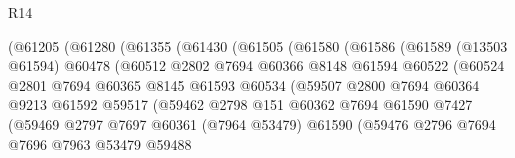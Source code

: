\begin{lexlean}{R14}
\begin{coremodule}
                        (@61205
                          (@61280
                            (@61355
                              (@61430
                                (@61505
                                  (@61580
                                    (@61586
                                      (@61589
                                        (@13503 @61594)
                                        @60478
                                        (@60512
                                          @2802
                                          @7694
                                          @60366
                                          @8148
                                          @61594
                                          @60522
                                          (@60524
                                            @2801
                                            @7694
                                            @60365
                                            @8145
                                            @61593
                                            @60534
                                            (@59507
                                              @2800
                                              @7694
                                              @60364
                                              @9213
                                              @61592
                                              @59517
                                              (@59462
                                                @2798
                                                @151
                                                @60362
                                                @7694
                                                @61590
                                                @7427
                                                (@59469
                                                  @2797
                                                  @7697
                                                  @60361
                                                  (@7964 @53479)
                                                  @61590
                                                  (@59476
                                                    @2796
                                                    @7694
                                                    @7696
                                                    @7963
                                                    @53479
                                                    @59488

\end{coremodule}
\end{lexlean}

